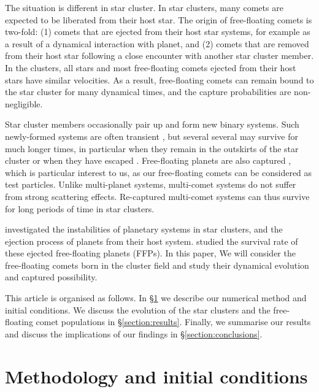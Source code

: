 \documentclass[usenatbib]{mn2e}
\begin{document}

The situation is different in star cluster. In star clusters, many comets are expected to be liberated from their host star. The origin of free-floating comets is two-fold: (1) comets that are ejected from their host star systems, for example as a result of a dynamical interaction with planet, and (2) comets that are removed from their host star following a close encounter with another star cluster member. In the clusters, all stars and most free-floating comets ejected from their host stars have similar velocities. As a result, free-floating comets can remain bound to the star cluster for many dynamical times, and the capture probabilities are non-negligible.

Star cluster members occasionally pair up and form new binary systems. Such newly-formed systems are often transient \citep[e.g.,][]{Moeckel:2011aa}, but several several may survive for much longer times, in particular when they remain in the outskirts of the star cluster or when they have escaped \citep{Kouwenhoven:2010aa}. Free-floating planets are also captured \citep{Perets:2012aa}, which is particular interest to us, as our free-floating comets can be considered as test particles. Unlike multi-planet systems, multi-comet systems do not suffer from strong scattering effects. Re-captured multi-comet systems can thus survive for long periods of time in star clusters.


\cite{Spurzem:2009aa} investigated the instabilities of planetary systems in star clusters, and the ejection process of planets from their host system.  \cite{Wang:2015ab}  studied the survival rate of these ejected free-floating planets (FFPs). In this paper, We will consider the free-floating comets born in the cluster field and study their dynamical evolution and captured possibility.

This article is organised as follows. In \S\ref{section:method} we describe our numerical method and initial conditions. We discuss the evolution of the star clusters and the free-floating comet populations in \S\ref{section:results}. Finally, we summarise our results and discuss the implications of our findings in \S\ref{section:conclusions}.

\section{Methodology and initial conditions} \label{section:method}
\end{document}
